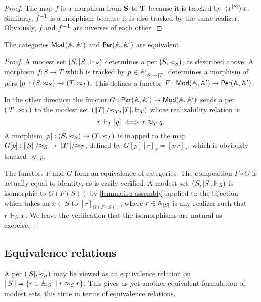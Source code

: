 \begin{proof}
  The map $f$ is a morphism from $\mathbf{S}$ to $\mathbf{T}$ because it is
  tracked by~$\langle x^{|S|} \rangle\,{x}$. Similarly, ${f}^{-1}$ is a
  morphism because it is also tracked by the same realizer. Obviously,
  $f$ and ${f}^{-1}$ are inverses of each other.
\end{proof}


\begin{proposition}
  The categories $\mathsf{Mod}(\mathbb{A}, \mathbb{A}')$ and $\mathsf{Per}(\mathbb{A}, \mathbb{A}')$ are
  equivalent.
\end{proposition}

\begin{proof}
  A modest set $(S, |S|, {\Vdash_{S}})$ determines a per $(S, {\approx_S})$,
  as described above. A morphism $f : S \to T$ which is tracked by $p
  \in \mathbb{A}'_{|S| \to |T|}$ determines a morphism of pers $[p] : (S,
  {\approx_S}) \to (T, {\approx_T})$. This defines a functor $F : \mathsf{Mod}(\mathbb{A},
    \mathbb{A}') \to \mathsf{Per}(\mathbb{A}, \mathbb{A}')$.

  In the other direction the functor $G : \mathsf{Per}(\mathbb{A}, \mathbb{A}') \to
  \mathsf{Mod}(\mathbb{A}, \mathbb{A}')$ sends a per $(|T|, {\approx_T})$ to the modest set
  $(\|T\|/{\approx_T}, |T|, {\Vdash_T})$ whose realizability relation is
  \begin{equation*}
    r \Vdash_T [q] \iff r \approx_T q.
  \end{equation*}
  A morphism $[p] : (S, {\approx_S}) \to (T, {\approx_T})$ is mapped to the
  map $G [p] : \|S\|/{\approx_S} \to \|T\|/{\approx_T}$, defined by $G [p]
  [r]_S = [p\,r]_T$, which is obviously tracked by~$p$.

  The functors $F$ and $G$ form an equivalence of categories. The
  composition $F \circ G$ is actually equal to identity, as is easily
  verified. A modest set~$(S, |S|, {\Vdash_{S}})$ is isomorphic to
  $G(F(S))$ by \cref{lemma:iso-assembly} applied to the bijection
  which takes an $x \in S$ to $[r]_{G(F(S))}$, where $r \in \mathbb{A}_{|S|}$
  is any realizer such that $r \Vdash_S x$. We leave the verification
  that the isomorphisms are natural as exercise.
\end{proof}


\subsection{Equivalence relations}
\label{sec:ers}

A per $(|S|, {\approx_S})$ may be viewed as an equivalence relation on
$\|S\| = \{r \in \mathbb{A}_{|S|} \mid r \approx_S r\}$. This gives us yet
another equivalent formulation of modest sets, this time in terms of
equivalence relations.

